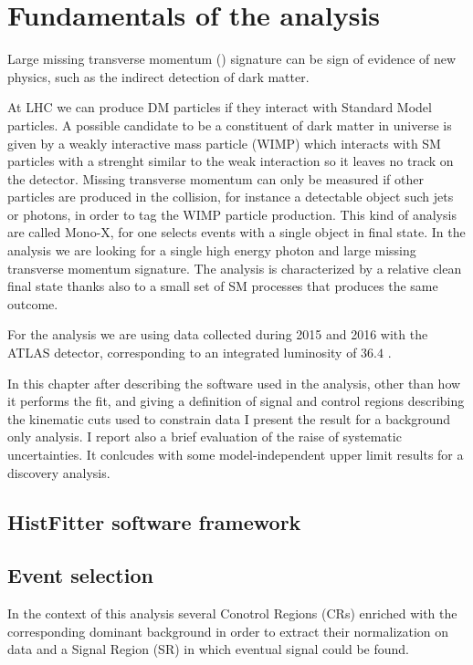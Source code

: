\chapter{Fundamentals of the \mph analysis}
Large missing transverse momentum (\met) signature can be sign of evidence of new physics, such as the indirect detection of dark matter.

At LHC we can produce DM particles if they interact with Standard Model particles. A possible candidate to be a constituent of dark matter in universe is given by a weakly interactive mass particle (WIMP) which interacts with SM particles with a strenght similar to the weak interaction so it leaves no track on the detector. Missing transverse momentum can only be measured  if other particles are produced in the collision, for instance a detectable object such jets or photons, in order to tag the WIMP particle production. This kind of analysis are called Mono-X, for one selects events with a single object in final state. In the \mph analysis we are looking for a single high energy photon and large missing transverse momentum signature. The \mph analysis is characterized by a relative clean final state thanks also to a small set of SM processes that produces the same outcome.

For the analysis we are using data collected during 2015 and 2016 with the ATLAS detector, corresponding to an integrated luminosity of $36.4$ \ifb.

In this chapter after describing the software used in the analysis, other than how it performs the fit, and giving a definition of signal and control regions describing the kinematic cuts used to constrain data I present the result for a background only analysis. I report also a brief evaluation of the raise of systematic uncertainties. It conlcudes with some model-independent upper limit results for a discovery analysis.

\section{HistFitter software framework}
\lipsum[1]

\section{Event selection}
In the context of this \mph analysis several Conotrol Regions (CRs) enriched with the corresponding dominant background in order to extract their normalization on data and a Signal Region (SR) in which eventual signal could be found.

